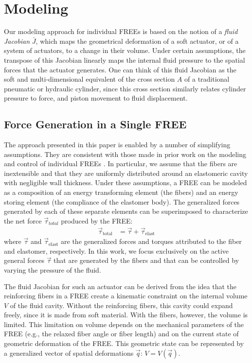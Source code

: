 \section{Modeling}
\label{sec:singleActuator}
%
Our modeling approach for individual FREEs is based on the notion of a \emph{fluid Jacobian} $\bar{J}$, which maps the geometrical deformation of a soft actuator, or of a system of actuators, to a change in their volume. 
Under certain assumptions, the transpose of this Jacobian linearly maps the internal fluid pressure to the spatial forces that the actuator generates. 
One can  think of this fluid Jacobian as the soft and multi-dimensional equivalent of the cross section $A$ of a traditional pneumatic or hydraulic cylinder,
since this cross section similarly relates cylinder pressure to force, and piston movement to fluid displacement.


\subsection{Force Generation in a Single FREE}
%
The approach presented in this paper is enabled by a number of simplifying assumptions.
They are consistent with those made in prior work on the modeling and control of individual FREEs \cite{bishop2015design,bruder2017model}.
In particular, we assume that the fibers are inextensible and that they are uniformly  distributed  around  an elastomeric cavity  with negligible  wall thickness.
Under these assumptions, a FREE can be modeled as a composition of an energy transforming element (the fibers) and an energy storing element (the compliance of the elastomer body). 
The generalized forces generated by each of these separate elements can be superimposed to characterize the net force $\vec{\tau}_{total}$ produced by the FREE:
\begin{align}
   \vec{\tau}_{\text{total}} &=  \vec{\tau} + \vec{\tau}_{\text{elast}}    \label{eq:netF}
\end{align}
where $\vec{\tau}$ and $\vec{\tau}_{\text{elast}}$ are the generalized forces and torques attributed to the fiber and elastomer, respectively.
In this work, we focus exclusively on the active general forces $\vec{\tau}$ that are generated by the fibers and that can be controlled by varying the pressure of the fluid.


The fluid Jacobian for such an actuator can be derived from the idea that the reinforcing fibers in a FREE create a kinematic constraint on the internal volume $V$ of the fluid cavity.
Without the reinforcing fibers, this cavity could expand freely, since it is made from soft material.
With the fibers, however, the volume is limited.
This limitation on volume depends on the mechanical parameters of the FREE (e.g., the relaxed fiber angle or fiber length) and on the current state of geometric deformation of the FREE.
This geometric state can be represented by a generalized vector of spatial deformations $\vec{q}$:  $V = V\left(\vec{q}\right)$.


